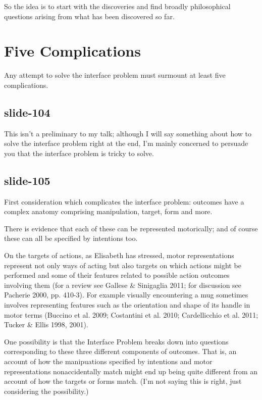 \documentclass[12pt,\papersize]{extarticle}
\begin{document}
So the idea is to start with the discoveries and find broadly philosophical
questions arising from what has been discovered so far.
 
 
 
\section{Five Complications}
 
Any attempt to solve the interface problem must surmount at least five complications.
 
\subsection{slide-104}
This isn’t a preliminary to my talk; although I will say something about how to solve
the interface problem right at the end, I’m mainly concerned to persuade you that
the interface problem is tricky to solve.
 
\subsection{slide-105}
First consideration which complicates the interface problem: outcomes have a complex anatomy
comprising manipulation, target, form and more.
 
There is evidence that each of these can be represented motorically; and of course these
can all be specified by intentions too.
 
On the targets of actions, as Elisabeth has stressed,
motor representations represent not only ways of acting but also targets on which actions
might be performed and some of their features related to possible action outcomes involving
them (for a review see Gallese \& Sinigaglia 2011; for discussion see Pacherie 2000, pp.
410-3). For example visually encountering a mug sometimes involves representing features
such as the orientation and shape of its handle in motor terms (Buccino et al. 2009;
Costantini et al. 2010; Cardellicchio et al. 2011; Tucker \& Ellis 1998, 2001).
 
One possibility is that the Interface Problem breaks down into questions corresponding
to these three different components of outcomes. That is, an account of how the manipuations
specified by intentions and motor representations nonaccidentally match might end up being
quite different from an account of how the targets or forms match.
(I’m not saying this is right, just considering the possibility.)
 
\end{document}
